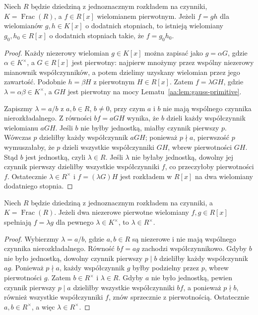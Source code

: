 \begin{lemat}
\label{aa:lem:gauss-denominators}
Niech $R$ będzie dziedziną z jednoznacznym rozkładem
na czynniki, $K=\operatorname{Frac}(R)$, a
$f\in R[x]$ wielomianem pierwotnym. Jeżeli
$f=gh$ dla wielomianów $g,h\in K[x]$ o dodatnich stopniach,
to istnieją wielomiany $g_0,h_0\in R[x]$ o dodatnich
stopniach takie, że $f=g_0h_0$.
\end{lemat}
\begin{proof}
Każdy niezerowy wielomian $g\in K[x]$ można zapisać
jako $g=\alpha G$, gdzie $\alpha\in K^\times$,
a $G\in R[x]$ jest pierwotny: najpierw mnożymy przez
wspólny niezerowy mianownik współczynników, a potem
dzielimy uzyskany wielomian przez jego zawartość.
Podobnie $h=\beta H$ z pierwotnym $H\in R[x]$.
Zatem $f=\lambda GH$, gdzie $\lambda=\alpha\beta\in K^\times$,
a $GH$ jest pierwotny na mocy Lematu~\ref{aa:lem:gauss-primitive}.

Zapiszmy $\lambda=a/b$ z $a,b\in R$, $b\ne0$,
przy czym $a$ i $b$ nie mają wspólnego czynnika nierozkładalnego.
Z równości $bf=aGH$ wynika, że $b$ dzieli każdy
współczynnik wielomianu $aGH$. Jeśli $b$ nie byłby
jednostką, miałby czynnik pierwszy $p$. Wówczas $p$
dzieliłby każdy współczynnik $aGH$; ponieważ $p\nmid a$,
pierwszość $p$ wymuszałaby, że $p$ dzieli wszystkie
współczynniki $GH$, wbrew pierwotności $GH$.
Stąd $b$ jest jednostką, czyli $\lambda\in R$.
Jeśli $\lambda$ nie byłaby jednostką, dowolny jej
czynnik pierwszy dzieliłby wszystkie współczynniki $f$,
co przeczyłoby pierwotności $f$. Ostatecznie
$\lambda\in R^\times$ i $f=(\lambda G)H$ jest rozkładem
w $R[x]$ na dwa wielomiany dodatniego stopnia.
\end{proof}

\begin{lemat}
\label{aa:lem:primitive-associates}
Niech $R$ będzie dziedziną z jednoznacznym rozkładem
na czynniki, a $K=\operatorname{Frac}(R)$.
Jeżeli dwa niezerowe pierwotne wielomiany
$f,g\in R[x]$ spełniają $f=\lambda g$ dla
pewnego $\lambda\in K^\times$, to $\lambda\in R^\times$.
\end{lemat}
\begin{proof}
Wybierzmy $\lambda=a/b$, gdzie $a,b\in R$ są
niezerowe i nie mają wspólnego czynnika nierozkładalnego.
Równość $bf=ag$ zachodzi współczynnikowo.
Gdyby $b$ nie było jednostką, dowolny czynnik pierwszy
$p\mid b$ dzieliłby każdy współczynnik $ag$.
Ponieważ $p\nmid a$, każdy współczynnik $g$ byłby
podzielny przez $p$, wbrew pierwotności $g$.
Zatem $b\in R^\times$ i $\lambda\in R$.
Gdyby $a$ nie było jednostką, pewien czynnik pierwszy
$p\mid a$ dzieliłby wszystkie współczynniki $bf$,
a ponieważ $p\nmid b$, również wszystkie współczynniki
$f$, znów sprzecznie z pierwotnością.
Ostatecznie $a,b\in R^\times$, a więc $\lambda\in R^\times$.
\end{proof}


